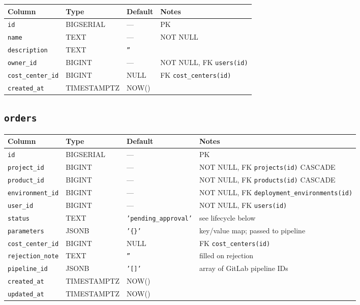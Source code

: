 \documentclass[12pt,a4paper,twoside]{report}
\newcommand{\code}[1]{\texttt{#1}}
\begin{document}
\begin{table}[H]
  \centering\small
  \begin{tabular}{@{}llll@{}}
    \toprule
    \textbf{Column} & \textbf{Type} & \textbf{Default} & \textbf{Notes} \\
    \midrule
    \code{id}             & BIGSERIAL   & ---   & PK \\
    \code{name}           & TEXT        & ---   & NOT NULL \\
    \code{description}    & TEXT        & \code{''} & \\
    \code{owner\_id}      & BIGINT      & ---   & NOT NULL, FK \textrightarrow{} \code{users(id)} \\
    \code{cost\_center\_id}& BIGINT     & NULL  & FK \textrightarrow{} \code{cost\_centers(id)} \\
    \code{created\_at}    & TIMESTAMPTZ & NOW() & \\
    \bottomrule
  \end{tabular}
\end{table}

\subsection*{\texttt{orders}}

\begin{table}[H]
  \centering\small
  \begin{tabular}{@{}llll@{}}
    \toprule
    \textbf{Column} & \textbf{Type} & \textbf{Default} & \textbf{Notes} \\
    \midrule
    \code{id}             & BIGSERIAL   & ---     & PK \\
    \code{project\_id}    & BIGINT      & ---     & NOT NULL, FK \textrightarrow{} \code{projects(id)} CASCADE \\
    \code{product\_id}    & BIGINT      & ---     & NOT NULL, FK \textrightarrow{} \code{products(id)} CASCADE \\
    \code{environment\_id}& BIGINT      & ---     & NOT NULL, FK \textrightarrow{} \code{deployment\_environments(id)} \\
    \code{user\_id}       & BIGINT      & ---     & NOT NULL, FK \textrightarrow{} \code{users(id)} \\
    \code{status}         & TEXT        & \code{'pending\_approval'} & see lifecycle below \\
    \code{parameters}     & JSONB       & \code{'\{\}'} & key/value map; passed to pipeline \\
    \code{cost\_center\_id}& BIGINT     & NULL    & FK \textrightarrow{} \code{cost\_centers(id)} \\
    \code{rejection\_note}& TEXT        & \code{''} & filled on rejection \\
    \code{pipeline\_id}   & JSONB       & \code{'[]'} & array of GitLab pipeline IDs \\
    \code{created\_at}    & TIMESTAMPTZ & NOW()   & \\
    \code{updated\_at}    & TIMESTAMPTZ & NOW()   & \\
    \bottomrule
  \end{tabular}
\end{table}
\end{document}
